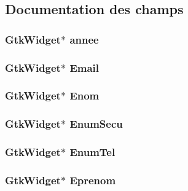 \subsection{Documentation des champs}
\hypertarget{struct_data_a123c0853fe0470eb0a0f0af055eecc9f}{
\subsubsection[{annee}]{\setlength{\rightskip}{0pt plus 5cm}Gtk\-Widget$\ast$ annee}}\label{struct_data_a123c0853fe0470eb0a0f0af055eecc9f}
\hypertarget{struct_data_a1003606a7c4d6a289a7de796987f6efc}{
\subsubsection[{Email}]{\setlength{\rightskip}{0pt plus 5cm}Gtk\-Widget$\ast$ Email}}\label{struct_data_a1003606a7c4d6a289a7de796987f6efc}
\hypertarget{struct_data_ad897fb7c962d60832bc766fa99da9db9}{
\subsubsection[{Enom}]{\setlength{\rightskip}{0pt plus 5cm}Gtk\-Widget$\ast$ Enom}}\label{struct_data_ad897fb7c962d60832bc766fa99da9db9}
\hypertarget{struct_data_abd6fcac327f5f3b0629a93916e3c29da}{
\subsubsection[{Enum\-Secu}]{\setlength{\rightskip}{0pt plus 5cm}Gtk\-Widget$\ast$ Enum\-Secu}}\label{struct_data_abd6fcac327f5f3b0629a93916e3c29da}
\hypertarget{struct_data_ae300afceb0206bd32dc11312abd38df6}{
\subsubsection[{Enum\-Tel}]{\setlength{\rightskip}{0pt plus 5cm}Gtk\-Widget$\ast$ Enum\-Tel}}\label{struct_data_ae300afceb0206bd32dc11312abd38df6}
\hypertarget{struct_data_a7004a9a326ad19f493ca2f6f3cc4577c}{
\subsubsection[{Eprenom}]{\setlength{\rightskip}{0pt plus 5cm}Gtk\-Widget$\ast$ Eprenom}}\label{struct_data_a7004a9a326ad19f493ca2f6f3cc4577c}
